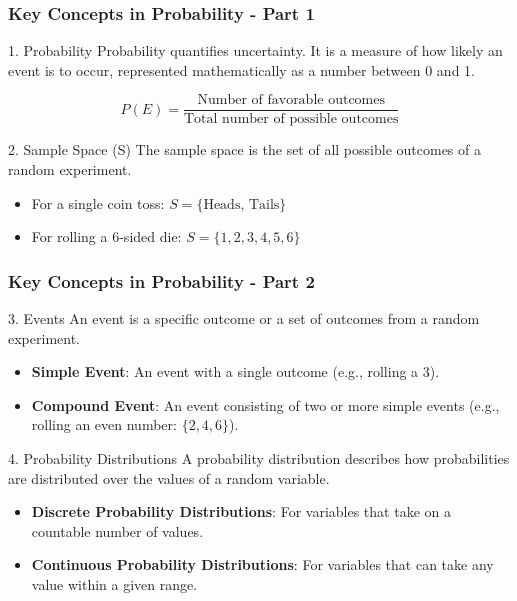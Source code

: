 \documentclass[aspectratio=169]{beamer}
\begin{document}
\begin{frame}[fragile]
    \frametitle{Key Concepts in Probability - Part 1}
    \begin{block}{1. Probability}
        Probability quantifies uncertainty. It is a measure of how likely an event is to occur, represented mathematically as a number between 0 and 1.
    \end{block}
    \begin{equation}
    P(E) = \frac{\text{Number of favorable outcomes}}{\text{Total number of possible outcomes}}
    \end{equation}
    
    \begin{block}{2. Sample Space (S)}
        The sample space is the set of all possible outcomes of a random experiment.
        \begin{itemize}
            \item For a single coin toss: $S = \{\text{Heads, Tails}\}$
            \item For rolling a 6-sided die: $S = \{1, 2, 3, 4, 5, 6\}$
        \end{itemize}
    \end{block}
\end{frame}

\begin{frame}[fragile]
    \frametitle{Key Concepts in Probability - Part 2}
    \begin{block}{3. Events}
        An event is a specific outcome or a set of outcomes from a random experiment. 
        \begin{itemize}
            \item \textbf{Simple Event}: An event with a single outcome (e.g., rolling a 3).
            \item \textbf{Compound Event}: An event consisting of two or more simple events (e.g., rolling an even number: $\{2, 4, 6\}$).
        \end{itemize}
    \end{block}
    
    \begin{block}{4. Probability Distributions}
        A probability distribution describes how probabilities are distributed over the values of a random variable.
        \begin{itemize}
            \item \textbf{Discrete Probability Distributions}: For variables that take on a countable number of values.
            \item \textbf{Continuous Probability Distributions}: For variables that can take any value within a given range.
        \end{itemize}
    \end{block}
\end{frame}
\end{document}
